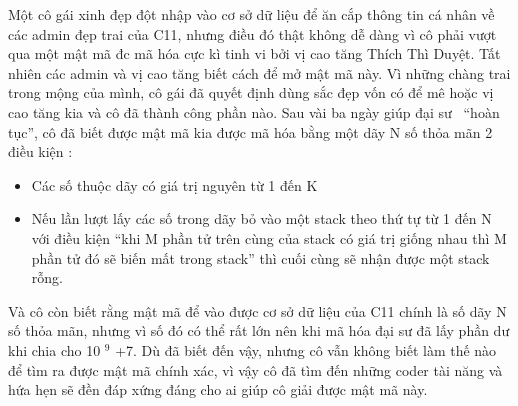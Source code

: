 Một cô gái xinh đẹp đột nhập vào cơ sở dữ liệu để ăn cắp thông tin cá nhân về các admin đẹp trai của C11, nhưng điều đó thật không dễ dàng vì cô phải vượt qua một mật mã đc mã hóa cực kì tinh vi bởi vị cao tăng Thích Thì Duyệt. Tất nhiên các admin và vị cao tăng biết cách để mở mật mã này. Vì những chàng trai trong mộng của mình, cô gái đã quyết định dùng sắc đẹp vốn có để mê hoặc vị cao tăng kia và cô đã thành công phần nào. Sau vài ba ngày giúp đại sư  “hoàn tục”, cô đã biết được mật mã kia được mã hóa bằng một dãy N số thỏa mãn 2 điều kiện :  
\begin{itemize}
	\item     Các số thuộc dãy có giá trị nguyên từ 1 đến K   
	\item     Nếu lần lượt lấy các số trong dãy bỏ vào một stack theo thứ tự từ 1 đến N  với điều kiện “khi M phần tử trên cùng của stack có giá trị giống nhau  thì M phần tử đó sẽ biến mất trong stack” thì cuối cùng sẽ nhận được một  stack rỗng.   
\end{itemize}

   Và cô còn biết rằng mật mã để vào được cơ sở dữ liệu của C11 chính là số dãy N số thỏa mãn, nhưng vì số đó có thể rất lớn nên khi mã hóa đại sư đã lấy phần dư khi chia cho 10   $^    9   $   +7. Dù đã biết đến vậy, nhưng cô vẫn không biết làm thế nào để tìm ra được mật mã chính xác, vì vậy cô đã tìm đến những coder tài năng và hứa hẹn sẽ đền đáp xứng đáng cho ai giúp cô giải được mật mã này.